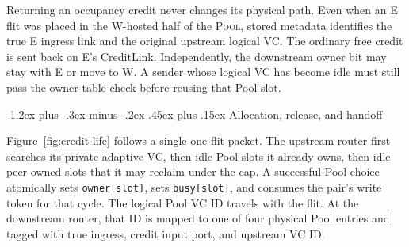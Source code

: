 \documentclass[10pt,twocolumn]{article}
\makeatletter
\newcommand{\pool}{\textsc{Pool}\xspace}
\renewcommand\subsection{\@startsection{subsection}{2}{\z@}%
  {-1.2ex plus -.3ex minus -.2ex}%
  {.45ex plus .15ex}%
  {\normalfont\normalsize\bfseries}}
\makeatother
\begin{document}
Returning an occupancy credit never changes its physical path. Even when an E
flit was placed in the W-hosted half of the \pool, stored metadata identifies
the true E ingress link and the original upstream logical VC. The ordinary
free credit is sent back on E's CreditLink. Independently, the downstream
owner bit may stay with E or move to W. A sender whose logical VC has become
idle must still pass the owner-table check before reusing that Pool slot.

\subsection{Allocation, release, and handoff}

Figure~\ref{fig:credit-life} follows a single one-flit packet. The upstream router
first searches its private adaptive VC, then idle Pool slots it already owns,
then idle peer-owned slots that it may reclaim under the cap. A successful
Pool choice atomically sets \texttt{owner[slot]}, sets
\texttt{busy[slot]}, and consumes the pair's write token for that cycle. The
logical Pool VC ID travels with the flit. At the downstream router, that ID is
mapped to one of four physical Pool entries and tagged with true ingress,
credit input port, and upstream VC ID.
\end{document}
